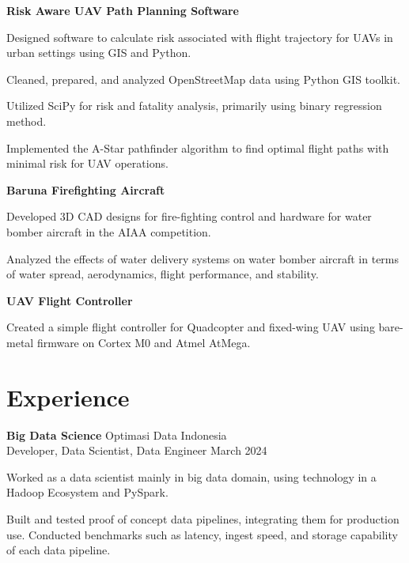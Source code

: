 \documentclass[12pt]{report}
\begin{document}
    \textbf{Risk Aware UAV Path Planning Software} \\
    \begin{myitemize}[left=0pt]
        \item Designed software to calculate risk associated with flight trajectory for UAVs in urban settings using GIS and Python.
        \item Cleaned, prepared, and analyzed OpenStreetMap data using Python GIS toolkit.
        \item Utilized SciPy for risk and fatality analysis, primarily using binary regression method.
        \item Implemented the A-Star pathfinder algorithm to find optimal flight paths with minimal risk for UAV operations.
    \end{myitemize}

    \textbf{Baruna Firefighting Aircraft} \\
    \begin{myitemize}[left=0pt]
        \item Developed 3D CAD designs for fire-fighting control and hardware for water bomber aircraft in the AIAA competition.
        \item Analyzed the effects of water delivery systems on water bomber aircraft in terms of water spread, aerodynamics, flight performance, and stability.
    \end{myitemize}

    \textbf{UAV Flight Controller} \\
    \begin{myitemize}[left=0pt]
        \item Created a simple flight controller for Quadcopter and fixed-wing UAV using bare-metal firmware on Cortex M0 and Atmel AtMega.
    \end{myitemize}

    \section*{Experience}
    \textbf{Big Data Science} \hfill Optimasi Data Indonesia \\
    Developer, Data Scientist, Data Engineer \hfill March 2024 \\
    \begin{myitemize}[left=0pt]
        \item Worked as a data scientist mainly in big data domain, using technology in a Hadoop Ecosystem and PySpark.
        \item Built and tested proof of concept data pipelines, integrating them for production use. Conducted benchmarks such as latency, ingest speed, and storage capability of each data pipeline.
    \end{myitemize}
\end{document}
